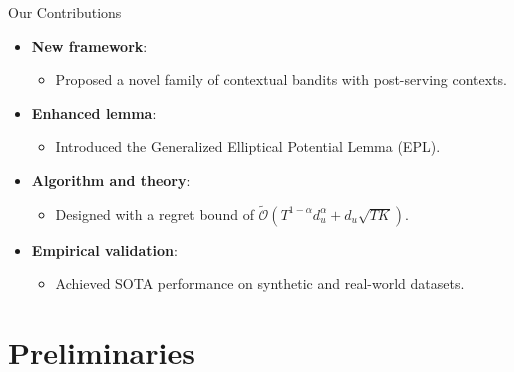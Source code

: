 \documentclass[10pt, xcolor={dvipsnames,x11names},compress]{beamer}
\begin{document}


\begin{frame}{Our Contributions}
\begin{itemize}
    \item \textbf{New framework}: 
    \begin{itemize}
        \item Proposed a novel family of contextual bandits with post-serving contexts.
    \end{itemize}
    \item \textbf{Enhanced lemma}: 
    \begin{itemize}
        \item Introduced the Generalized Elliptical Potential Lemma (EPL).
    \end{itemize}
    \item \textbf{Algorithm and theory}: 
    \begin{itemize}
        \item Designed \textbf{\polinucb} with a regret bound of \( \widetilde{\mathcal{O}}(T^{1-\alpha}d_u^{\alpha} + d_u\sqrt{T K })\).
    \end{itemize}
    \item \textbf{Empirical validation}: 
    \begin{itemize}
        \item Achieved SOTA performance on synthetic and real-world datasets.
    \end{itemize}
\end{itemize}


\end{frame}




\section{Preliminaries}


\end{document}
